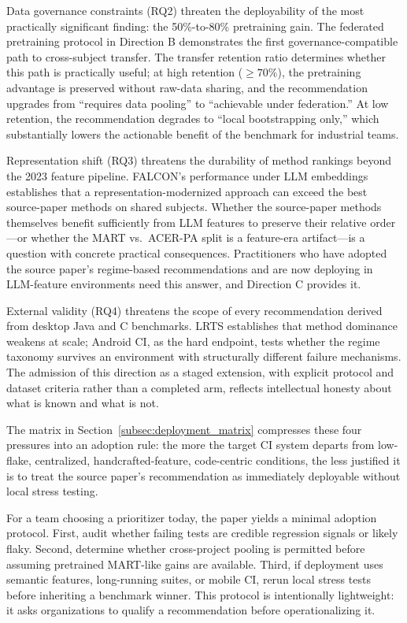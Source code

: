 \documentclass[10pt,conference]{IEEEtran}
\begin{document}
Data governance constraints (RQ2) threaten the deployability of the most practically significant finding: the 50\%-to-80\% pretraining gain. The federated pretraining protocol in Direction B demonstrates the first governance-compatible path to cross-subject transfer. The transfer retention ratio determines whether this path is practically useful; at high retention ($\geq 70\%$), the pretraining advantage is preserved without raw-data sharing, and the recommendation upgrades from ``requires data pooling'' to ``achievable under federation.'' At low retention, the recommendation degrades to ``local bootstrapping only,'' which substantially lowers the actionable benefit of the benchmark for industrial teams.

Representation shift (RQ3) threatens the durability of method rankings beyond the 2023 feature pipeline. FALCON's performance under LLM embeddings establishes that a representation-modernized approach can exceed the best source-paper methods on shared subjects. Whether the source-paper methods themselves benefit sufficiently from LLM features to preserve their relative order---or whether the MART vs.\ ACER-PA split is a feature-era artifact---is a question with concrete practical consequences. Practitioners who have adopted the source paper's regime-based recommendations and are now deploying in LLM-feature environments need this answer, and Direction C provides it.

External validity (RQ4) threatens the scope of every recommendation derived from desktop Java and C benchmarks. LRTS establishes that method dominance weakens at scale; Android CI, as the hard endpoint, tests whether the regime taxonomy survives an environment with structurally different failure mechanisms. The admission of this direction as a staged extension, with explicit protocol and dataset criteria rather than a completed arm, reflects intellectual honesty about what is known and what is not.

The matrix in Section~\ref{subsec:deployment_matrix} compresses these four pressures into an adoption rule: the more the target CI system departs from low-flake, centralized, handcrafted-feature, code-centric conditions, the less justified it is to treat the source paper's recommendation as immediately deployable without local stress testing.

For a team choosing a prioritizer today, the paper yields a minimal adoption protocol. First, audit whether failing tests are credible regression signals or likely flaky. Second, determine whether cross-project pooling is permitted before assuming pretrained MART-like gains are available. Third, if deployment uses semantic features, long-running suites, or mobile CI, rerun local stress tests before inheriting a benchmark winner. This protocol is intentionally lightweight: it asks organizations to qualify a recommendation before operationalizing it.
\end{document}
